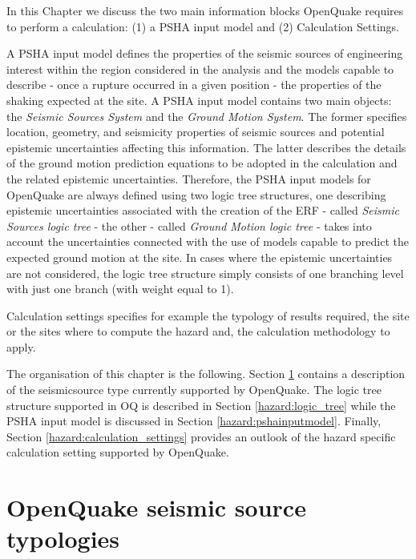 %
%
In this Chapter we discuss the two main information blocks OpenQuake 
requires to perform a calculation: (1) a PSHA input model and (2) 
Calculation Settings.

A PSHA input model defines the properties of the seismic sources 
of engineering  interest within the region considered in the analysis and the 
models capable to describe - once a rupture occurred in a given position - the 
properties of the shaking expected at the site. 
%
A PSHA input model contains two main objects: the \emph{Seismic Sources System} 
and the \emph{Ground Motion System}. 
%
The former specifies location, geometry, and seismicity properties of seismic 
sources and potential epistemic uncertainties affecting this information. 
%
The latter describes the details of the ground motion prediction equations to 
be adopted in the calculation and the related epistemic uncertainties. 
%
Therefore, the PSHA input models for OpenQuake are always defined using two 
logic tree structures, one describing epistemic uncertainties associated 
with the creation of the ERF - called \emph{Seismic Sources logic tree} - 
the other - called \emph{Ground Motion logic tree} - takes into account 
the uncertainties connected with the use of models capable to predict the 
expected ground motion at the site. 
%
In cases where the epistemic uncertainties are not considered, the logic tree 
structure simply consists of one branching level with just one branch (with 
weight equal to 1).

Calculation settings specifies for example the typology of results required,
the site or the sites where to compute the hazard and, the calculation
methodology to apply.

The organisation of this chapter is the following.  
Section \ref{hazard:seismic_source_types} contains a description of the 
seismicsource type currently supported by OpenQuake. 
The logic tree structure supported in OQ is described in Section 
\ref{hazard:logic_tree} while the PSHA input model is discussed in 
Section \ref{hazard:pshainputmodel}.
Finally, Section \ref{hazard:calculation_settings} provides an outlook 
of the hazard specific calculation setting supported by OpenQuake.
%
\section[OpenQuake seismic source typologies]{OpenQuake seismic source 
typologies}
\label{hazard:seismic_source_types}

%
